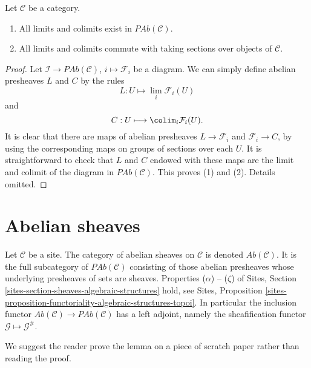 \begin{lemma}
\label{lemma-limits-colimits-abelian-presheaves}
Let $\mathcal{C}$ be a category.
\begin{enumerate}
\item All limits and colimits exist in $\textit{PAb}(\mathcal{C})$.
\item All limits and colimits commute with taking sections over objects of
$\mathcal{C}$.
\end{enumerate}
\end{lemma}

\begin{proof}
Let $\mathcal{I} \to \textit{PAb}(\mathcal{C})$, $i \mapsto \mathcal{F}_i$
be a diagram. We can simply define abelian presheaves
$L$ and $C$ by the rules
$$
L : U \longmapsto \lim_i \mathcal{F}_i(U)
$$
and
$$
C : U \longmapsto \colim_i \mathcal{F}_i(U).
$$
It is clear that there are maps of abelian presheaves $L \to \mathcal{F}_i$
and $\mathcal{F}_i \to C$, by using the corresponding maps on groups of
sections over each $U$. It is straightforward to check that $L$ and $C$ endowed
with these maps are the limit and colimit of the diagram in
$\textit{PAb}(\mathcal{C})$. This proves (1) and (2). Details omitted.
\end{proof}


\section{Abelian sheaves}
\label{section-abelian-sheaves}

\noindent
Let $\mathcal{C}$ be a site.
The category of abelian sheaves on $\mathcal{C}$ is denoted
$\textit{Ab}(\mathcal{C})$. It is the full subcategory of
$\textit{PAb}(\mathcal{C})$ consisting of those abelian presheaves
whose underlying presheaves of sets are sheaves.
Properties ($\alpha$) -- ($\zeta$) of
Sites, Section \ref{sites-section-sheaves-algebraic-structures}
hold, see
Sites,
Proposition \ref{sites-proposition-functoriality-algebraic-structures-topoi}.
In particular the inclusion functor
$\textit{Ab}(\mathcal{C}) \to \textit{PAb}(\mathcal{C})$
has a left adjoint, namely the sheafification functor
$\mathcal{G} \mapsto \mathcal{G}^\#$.

\medskip\noindent
We suggest the reader prove the lemma on a piece of scratch paper rather
than reading the proof.


